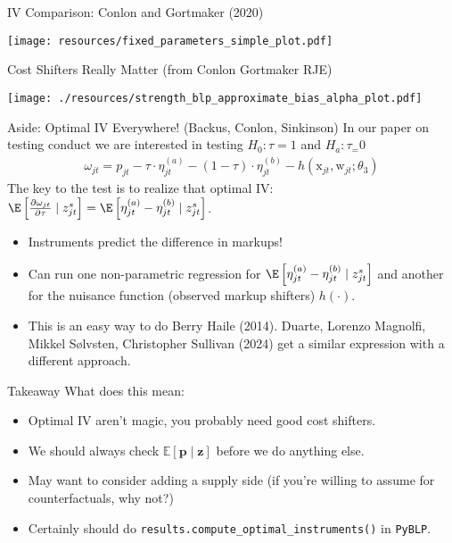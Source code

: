 \begin{frame}{IV Comparison: Conlon and Gortmaker (2020)}
\begin{center}
\texttt{[image: resources/fixed\_parameters\_simple\_plot.pdf]}
\end{center}
\end{frame}


\begin{frame}{Cost Shifters Really Matter (from Conlon Gortmaker RJE)}
\begin{center}
    \texttt{[image: ./resources/strength\_blp\_approximate\_bias\_alpha\_plot.pdf]}
\end{center}
\end{frame}

\begin{frame}{Aside: Optimal IV Everywhere! (Backus, Conlon, Sinkinson)}
In our paper on testing conduct we are interested in testing $H_0: \tau=1$ and $H_a: \tau_=0$
\begin{align*}
\omega_{jt} = p_{jt} -\tau \cdot \eta_{jt}^{(a)} - (1-\tau) \cdot \eta_{jt}^{(b)} - h(\textrm{x}_{jt},\textrm{w}_{jt}; \theta_3) 
\end{align*}
The key to the test is to realize that optimal IV: $\E\left[\frac{\partial \omega_{jt}}{\partial \tau} \mid z_{jt}^s \right] = \E\left[\eta_{jt}^{(a)} -\eta_{jt}^{(b)} \mid z_{jt}^s \right]$.
\begin{itemize}
    \item Instruments \alert{predict the difference in markups}!
    \item Can run one non-parametric regression for  $\E\left[\eta_{jt}^{(a)} -\eta_{jt}^{(b)} \mid z_{jt}^s \right]$ and another for the nuisance function (observed markup shifters) $h(\cdot)$.
    \item This is an easy way to do Berry Haile (2014). Duarte, Lorenzo Magnolfi, Mikkel Sølvsten, Christopher Sullivan (2024) get a similar expression with a different approach.
\end{itemize}
\end{frame}


\begin{frame}{Takeaway}
What does this mean:
\begin{itemize}
    \item Optimal IV aren't magic, you probably need good cost shifters.
    \item We should always check $\mathbb{E}[\mathbf{p} \mid \mathbf{z}]$ before we do anything else.
    \item May want to consider adding a supply side (if you're willing to assume for counterfactuals, why not?)
    \item Certainly should do \texttt{results.compute\_optimal\_instruments()} in \texttt{PyBLP}.
\end{itemize}
\end{frame}




